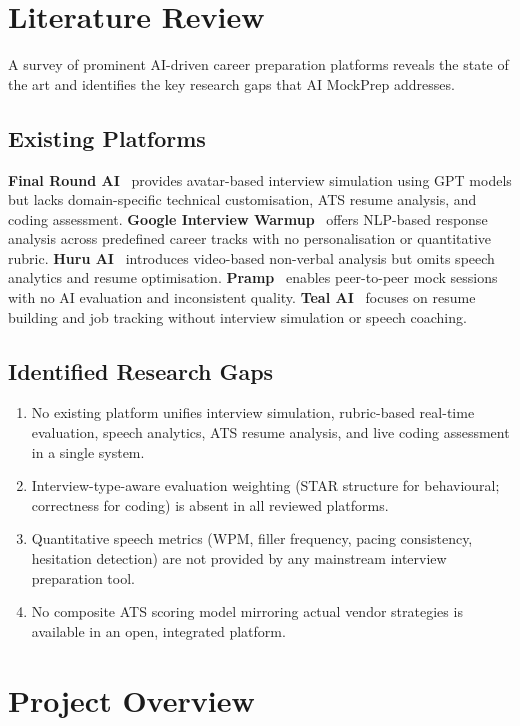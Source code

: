 \documentclass[12pt,a4paper,oneside]{report}
\begin{document}
\section{Literature Review}
\label{sec:ch1_litreview}

A survey of prominent AI-driven career preparation platforms reveals the state of the art and identifies the key research gaps that AI MockPrep addresses.

\subsection{Existing Platforms}
\textbf{Final Round AI}~\cite{ref_finalroundai} provides avatar-based interview simulation using GPT models but lacks domain-specific technical customisation, ATS resume analysis, and coding assessment. \textbf{Google Interview Warmup}~\cite{ref_google_warmup} offers NLP-based response analysis across predefined career tracks with no personalisation or quantitative rubric. \textbf{Huru AI}~\cite{ref_huru} introduces video-based non-verbal analysis but omits speech analytics and resume optimisation. \textbf{Pramp}~\cite{ref_pramp} enables peer-to-peer mock sessions with no AI evaluation and inconsistent quality. \textbf{Teal AI}~\cite{ref_teal} focuses on resume building and job tracking without interview simulation or speech coaching.

\subsection{Identified Research Gaps}
\begin{enumerate}
  \item No existing platform unifies interview simulation, rubric-based real-time evaluation, speech analytics, ATS resume analysis, and live coding assessment in a single system.
  \item Interview-type-aware evaluation weighting (STAR structure for behavioural; correctness for coding) is absent in all reviewed platforms.
  \item Quantitative speech metrics (WPM, filler frequency, pacing consistency, hesitation detection) are not provided by any mainstream interview preparation tool.
  \item No composite ATS scoring model mirroring actual vendor strategies is available in an open, integrated platform.
\end{enumerate}


\section{Project Overview}
\label{sec:project_overview}
\end{document}
